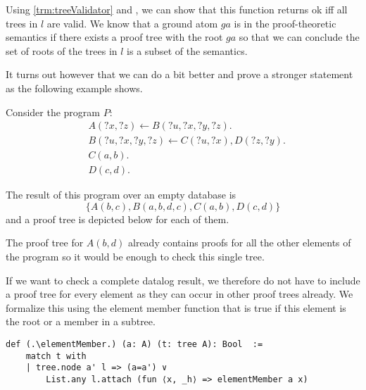 Using \cref{trm:treeValidator} and \ListmapexceptunitIsUnitIffAll, we can show that this function returns ok iff all trees in $l$ are valid. We know that a ground atom $ga$ is in the proof-theoretic semantics if there exists a proof tree with the root $ga$ so that we can conclude the set of roots of the trees in $l$ is a subset of the semantics. 


It turns out however that we can do a bit better and prove a stronger statement as the following example shows.
\begin{example}
    Consider the program $P:$
    \begin{align*}
        & A(?x, ?z) \leftarrow B(?u,?x, ?y, ?z). \\
        & B(?u,?x, ?y, ?z) \leftarrow C(?u,?x), D(?z, ?y). \\
        & C(a,b). \\
        & D(c,d).
        \end{align*}

    The result of this program over an empty database is \[\{A(b,c), B(a,b,d,c), C(a,b), D(c,d)\}\] and a proof tree is depicted below for each of them.



    The proof tree for $A(b,d)$ already contains proofs for all the other elements of the program so it would be enough to check this single tree.
\end{example}

If we want to check a complete datalog result, we therefore do not have to include a proof tree for every element as they can occur in other proof trees already. We formalize this using the element member function that is true if this element is the root or a member in a subtree.

\begin{lstlisting}
def (.\elementMember.) (a: A) (t: tree A): Bool  :=
    match t with
    | tree.node a' l => (a=a') ∨
        List.any l.attach (fun ⟨x, _h⟩ => elementMember a x)
\end{lstlisting}

